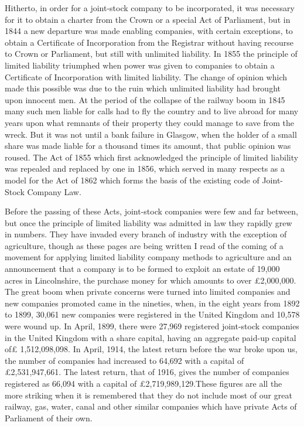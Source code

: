 \documentclass{book}
\begin{document}
Hitherto, in order for a joint-stock company to be incorporated, it was necessary for it to obtain a charter from the Crown or a special Act of Parliament, but in 1844 a new departure was made enabling companies, with certain exceptions, to obtain a Certificate of Incorporation from the Registrar without having recourse to Crown or Parliament, but still with unlimited liability. In 1855 the principle of limited liability triumphed when power was given to companies to obtain a Certificate of Incorporation with limited liability. The change of opinion which made this possible was due to the ruin which unlimited liability had brought upon innocent men. At the period of the collapse of the railway boom in 1845 many such men liable for calls had to fly the country and to live abroad for many years upon what remnants of their property they could manage to save from the wreck. But it was not until a bank failure in Glasgow, when the holder of a small share was made liable for a thousand times its amount, that public opinion was roused. The Act of 1855 which first acknowledged the principle of limited liability was repealed and replaced by one in 1856, which served in many respects as a model for the Act of 1862 which forms the basis of the existing code of Joint-Stock Company Law.

Before the passing of these Acts, joint-stock companies were few and far between, but once the principle of limited liability was admitted in law they rapidly grew in numbers. They have invaded every branch of industry with the exception of agriculture, though as these pages are being written I read of the coming of a movement for applying limited liability company methods to agriculture and an announcement that a company is to be formed to exploit an estate of 19,000 acres in Lincolnshire, the purchase money for which amounts to over £2,000,000. The great boom when private concerns were turned into limited companies and new companies promoted came in the nineties, when, in the eight years from 1892 to 1899, 30,061 new companies were registered in the United Kingdom and 10,578 were wound up. In April, 1899, there were 27,969 registered joint-stock companies in the United Kingdom with a share capital, having an aggregate paid-up capital of£ 1,512,098,098. In April, 1914, the latest return before the war broke upon us, the number of companies had increased to 64,692 with a capital of £2,531,947,661. The latest return, that of 1916, gives the number of companies registered as 66,094 with a capital of £2,719,989,129.\footnotemark[1] These figures are all the more striking when it is remembered that they do not include most of our great railway, gas, water, canal and other similar companies which have private Acts of Parliament of their own.
\end{document}
